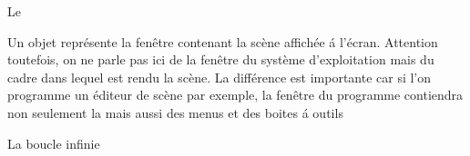 Le 

Un objet  repr\'esente la fen\^etre contenant la sc\`ene affich\'ee \'a l'\'ecran. Attention toutefois, on ne parle pas ici de la fen\^etre du syst\`eme d'exploitation mais du cadre dans lequel est rendu la sc\`ene. La diff\'erence est importante car si l'on programme un \'editeur de sc\`ene par exemple, la fen\^etre du programme contiendra non seulement la  mais aussi des menus et des boites \'a outils

La boucle infinie  
